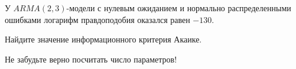 
\begin{question}
У \(ARMA(2, 3)\)-модели с нулевым ожиданием и нормально распределенными ошибками логарифм правдоподобия оказался равен \(-130\).

Найдите значение информационного критерия Акаике.
\end{question}

\begin{solution}
Не забудьте верно посчитать число параметров!
\end{solution}

